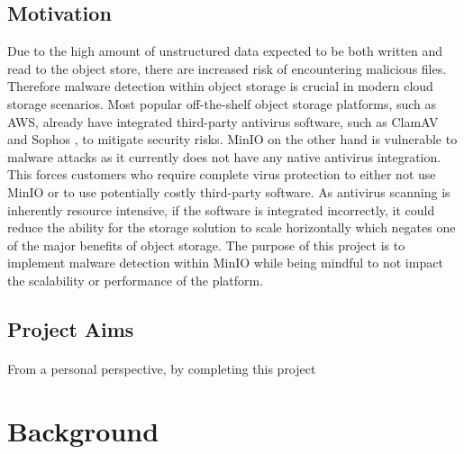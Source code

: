 \documentclass[12pt, conference, final, a4paper, onecolumn, compsoc]{IEEEtran}
\begin{document}
\subsection*{Motivation} %

Due to the high amount of unstructured data expected to be both written and read
to the object store, there are increased risk of encountering malicious files.
Therefore malware detection within object storage is crucial in modern cloud
storage scenarios. Most popular off-the-shelf object storage platforms, such as
AWS, already have integrated third-party antivirus software, such as ClamAV and
Sophos \citep{amazon-md}, to mitigate security risks. MinIO on the other hand is
vulnerable to malware attacks as it currently does not have any native antivirus
integration. This forces customers who require complete virus protection to
either not use MinIO or to use potentially costly third-party software. As
antivirus scanning is inherently resource intensive, if the software is
integrated incorrectly, it could reduce the ability for the storage solution to
scale horizontally which negates one of the major benefits of object storage.
The purpose of this project is to implement malware detection within MinIO while
being mindful to not impact the scalability or performance of the platform.

\subsection*{Project Aims} %


\paragraph{}
From a personal perspective, by completing this project


\section{Background}

\end{document}
